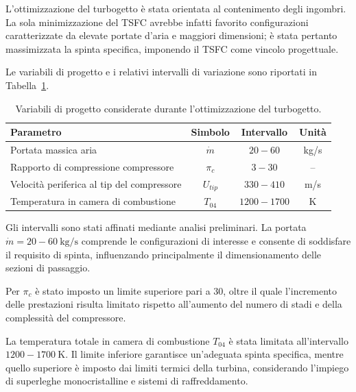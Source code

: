 L'ottimizzazione del turbogetto è stata orientata al contenimento degli
ingombri. La sola minimizzazione del TSFC avrebbe infatti favorito
configurazioni caratterizzate da elevate portate d'aria e maggiori
dimensioni; è stata pertanto massimizzata la spinta specifica, imponendo
il TSFC come vincolo progettuale.

Le variabili di progetto e i relativi intervalli di variazione sono
riportati in Tabella~\ref{tab:var_turbojet}.

\begin{table}[H]
\centering
\fontsize{11pt}{11pt}\selectfont
\renewcommand{\arraystretch}{1}
\caption{Variabili di progetto considerate durante l'ottimizzazione del turbogetto.}
\label{tab:var_turbojet}
\begin{tabular}{lccc}
\toprule
\textbf{Parametro} & \textbf{Simbolo} & \textbf{Intervallo} & \textbf{Unità} \\
\midrule

Portata massica aria
& $\dot{m}$
& $20-60$
& kg/s \\

Rapporto di compressione compressore
& $\pi_c$
& $3-30$
& -- \\

Velocità periferica al tip del compressore
& $U_{tip}$
& $330-410$
& m/s \\

Temperatura in camera di combustione
& $T_{04}$
& $1200-1700$
& K \\

\bottomrule
\end{tabular}
\end{table}

Gli intervalli sono stati affinati mediante analisi preliminari. La portata
$\dot{m}=20{-}60\ \mathrm{kg/s}$ comprende le configurazioni di interesse
e consente di soddisfare il requisito di spinta, influenzando principalmente
il dimensionamento delle sezioni di passaggio. 



Per \(\pi_c\) è stato imposto un limite superiore pari a 30, oltre il quale l'incremento delle prestazioni risulta limitato rispetto all'aumento del numero di stadi e della complessità del compressore.

La temperatura totale in camera di combustione \(T_{04}\) è stata limitata all'intervallo \(1200{-}1700\ \mathrm{K}\). Il limite inferiore garantisce un'adeguata spinta specifica, mentre quello superiore è imposto dai limiti termici della turbina, considerando l'impiego di superleghe monocristalline e sistemi di raffreddamento.


